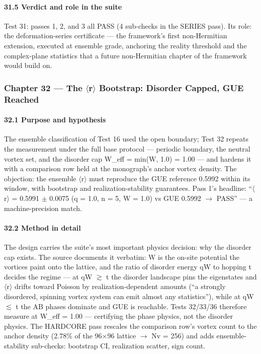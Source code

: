 \documentclass[10pt]{article}
\begin{document}
\paragraph{31.5 Verdict and role in the suite}

Test 31: passes 1, 2, and 3 all PASS (4 sub-checks in the SERIES pass). Its role: the deformation-series certificate --- the framework's first non-Hermitian extension, executed at ensemble grade, anchoring the reality threshold and the complex-plane statistics that a future non-Hermitian chapter of the framework would build on.

\subsubsection{Chapter 32 --- The $\langle$r$\rangle$ Bootstrap: Disorder Capped, GUE Reached}

\paragraph{32.1 Purpose and hypothesis}

The ensemble classification of Test 16 used the open boundary; Test 32 repeats the measurement under the full base protocol --- periodic boundary, the neutral vortex set, and the disorder cap W\_eff = min(W, 1.0) = 1.00 --- and hardens it with a comparison row held at the monograph's anchor vortex density. The objection: the ensemble $\langle$r$\rangle$ must reproduce the GUE reference 0.5992 within its window, with bootstrap and realization-stability guarantees. Pass 1's headline: ``$\langle$r$\rangle$ = 0.5991 $\pm$ 0.0075 (q = 1.0, n = 5, W = 1.0) vs GUE 0.5992 $\rightarrow$ PASS'' --- a machine-precision match.

\paragraph{32.2 Method in detail}

The design carries the suite's most important physics decision: why the disorder cap exists. The source documents it verbatim: W is the on-site potential the vortices paint onto the lattice, and the ratio of disorder energy q\textperiodcentered{}W to hopping t decides the regime --- at q\textperiodcentered{}W $\gtrsim$ t the disorder landscape pins the eigenstates and $\langle$r$\rangle$ drifts toward Poisson by realization-dependent amounts (``a strongly disordered, spinning vortex system can emit almost any statistics''), while at q\textperiodcentered{}W $\lesssim$ t the AB phases dominate and GUE is reachable. Tests 32/33/36 therefore measure at W\_eff = 1.00 --- certifying the phase physics, not the disorder physics. The HARDCORE pass rescales the comparison row's vortex count to the anchor density (2.78\% of the 96$\times$96 lattice $\rightarrow$ Nv = 256) and adds ensemble-stability sub-checks: bootstrap CI, realization scatter, sign count.
\end{document}
